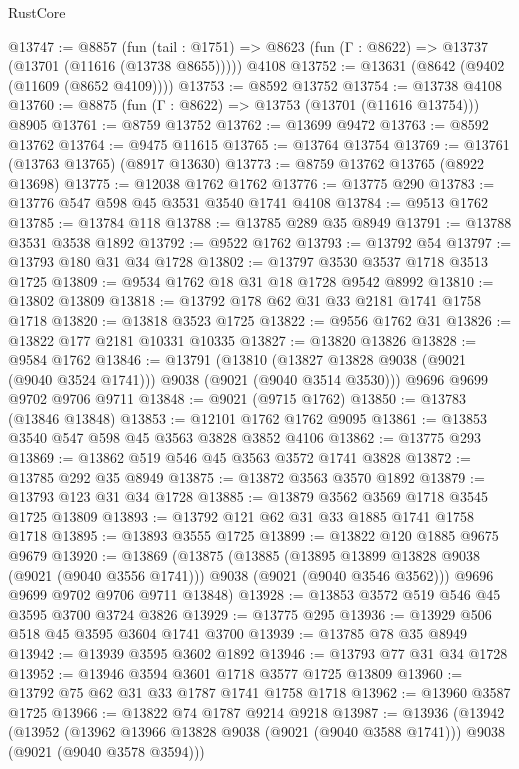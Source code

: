 \begin{lexlean}{RustCore}
\begin{coremodule}
@13747 := @8857
    (fun (tail : @1751) => @8623 (fun (Γ : @8622) => @13737 (@13701 (@11616 (@13738 @8655)))))
    @4108
@13752 := @13631 (@8642 (@9402 (@11609 (@8652 @4109))))
@13753 := @8592 @13752
@13754 := @13738 @4108
@13760 := @8875 (fun (Γ : @8622) => @13753 (@13701 (@11616 @13754))) @8905
@13761 := @8759 @13752
@13762 := @13699 @9472
@13763 := @8592 @13762
@13764 := @9475 @11615
@13765 := @13764 @13754
@13769 := @13761 (@13763 @13765) (@8917 @13630)
@13773 := @8759 @13762 @13765 (@8922 @13698)
@13775 := @12038 @1762 @1762
@13776 := @13775 @290
@13783 := @13776 @547 @598 @45 @3531 @3540 @1741 @4108
@13784 := @9513 @1762
@13785 := @13784 @118
@13788 := @13785 @289 @35 @8949
@13791 := @13788 @3531 @3538 @1892
@13792 := @9522 @1762
@13793 := @13792 @54
@13797 := @13793 @180 @31 @34 @1728
@13802 := @13797 @3530 @3537 @1718 @3513 @1725
@13809 := @9534 @1762 @18 @31 @18 @1728 @9542 @8992
@13810 := @13802 @13809
@13818 := @13792 @178 @62 @31 @33 @2181 @1741 @1758 @1718
@13820 := @13818 @3523 @1725
@13822 := @9556 @1762 @31
@13826 := @13822 @177 @2181 @10331 @10335
@13827 := @13820 @13826
@13828 := @9584 @1762
@13846 := @13791
    (@13810 (@13827 @13828 @9038 (@9021 (@9040 @3524 @1741))) @9038 (@9021 (@9040 @3514 @3530)))
    @9696
    @9699
    @9702
    @9706
    @9711
@13848 := @9021 (@9715 @1762)
@13850 := @13783 (@13846 @13848)
@13853 := @12101 @1762 @1762 @9095
@13861 := @13853 @3540 @547 @598 @45 @3563 @3828 @3852 @4106
@13862 := @13775 @293
@13869 := @13862 @519 @546 @45 @3563 @3572 @1741 @3828
@13872 := @13785 @292 @35 @8949
@13875 := @13872 @3563 @3570 @1892
@13879 := @13793 @123 @31 @34 @1728
@13885 := @13879 @3562 @3569 @1718 @3545 @1725 @13809
@13893 := @13792 @121 @62 @31 @33 @1885 @1741 @1758 @1718
@13895 := @13893 @3555 @1725
@13899 := @13822 @120 @1885 @9675 @9679
@13920 := @13869
    (@13875
      (@13885
        (@13895 @13899 @13828 @9038 (@9021 (@9040 @3556 @1741)))
        @9038
        (@9021 (@9040 @3546 @3562)))
      @9696
      @9699
      @9702
      @9706
      @9711
      @13848)
@13928 := @13853 @3572 @519 @546 @45 @3595 @3700 @3724 @3826
@13929 := @13775 @295
@13936 := @13929 @506 @518 @45 @3595 @3604 @1741 @3700
@13939 := @13785 @78 @35 @8949
@13942 := @13939 @3595 @3602 @1892
@13946 := @13793 @77 @31 @34 @1728
@13952 := @13946 @3594 @3601 @1718 @3577 @1725 @13809
@13960 := @13792 @75 @62 @31 @33 @1787 @1741 @1758 @1718
@13962 := @13960 @3587 @1725
@13966 := @13822 @74 @1787 @9214 @9218
@13987 := @13936
    (@13942
      (@13952
        (@13962 @13966 @13828 @9038 (@9021 (@9040 @3588 @1741)))
        @9038
        (@9021 (@9040 @3578 @3594)))

\end{coremodule}
\end{lexlean}
